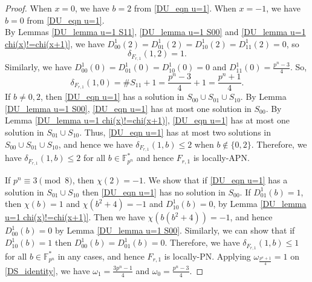 \documentclass[11pt]{article}
\numberwithin{theorem}{section}
\newcommand{\Fpnmul}{\mathbb{F}_{p^n}^*}
\begin{document}
\begin{proof}
	When $x=0$, we have $b=2$ from \eqref{DU_eqn u=1}. When $x=-1$, we have $b=0$ from \eqref{DU_eqn u=1}.\\
	By Lemmas \ref{DU_lemma u=1 S11}, \ref{DU_lemma u=1 S00} and \ref{DU_lemma u=1 chi(x)!=chi(x+1)}, we have $D_{00}^1(2)=D_{01}^1(2)=D_{10}^1(2)=D_{11}^1(2)=0$, so $$\delta_{F_{r,1}}(1,2)=1.$$
	Similarly, we have $D_{00}^1(0)=D_{01}^1(0)=D_{10}^1(0)=0$ and $D_{11}^1(0)=\frac{p^n-3}{4}$. So, 
	$$\delta_{F_{r,1}}(1,0) = \#S_{11} +1 =\frac{p^n-3}{4}+1=\frac{p^n+1}{4}.$$
	If $b\ne 0,2$, then \eqref{DU_eqn u=1} has a solution in $S_{00}\cup S_{01} \cup S_{10}$. By Lemma \ref{DU_lemma u=1 S00}, \eqref{DU_eqn u=1} has at most one solution in $S_{00}$.  By Lemma \ref{DU_lemma u=1 chi(x)!=chi(x+1)}, \eqref{DU_eqn u=1} has at most one solution in $S_{01} \cup S_{10}$. Thus, \eqref{DU_eqn u=1} has at most two solutions in $S_{00}\cup S_{01} \cup S_{10}$, and hence we have $\delta_{F_{r,1}}(1,b)\le 2$ when $b\not\in \{0,2\}$. Therefore, we have $\delta_{F_{r,1}}(1,b)\le 2$ for all $b\in \Fpnmul$ and hence $F_{r,1}$ is locally-APN.
	
	If $p^n\equiv 3\pmod{8}$, then $\chi(2)=-1$. We show that if \eqref{DU_eqn u=1} has a solution in $S_{01} \cup S_{10}$ then \eqref{DU_eqn u=1} has no solution in $S_{00}$. If $D_{01}^1(b)=1$, then $\chi(b)=1$ and $\chi(b^2+4)=-1$ and $D_{10}^1(b)=0$, by Lemma \ref{DU_lemma u=1 chi(x)!=chi(x+1)}. Then we have $\chi\left( b(b^2+4) \right) =-1$, and hence $D_{00}^1(b)=0$ by Lemma \ref{DU_lemma u=1 S00}. Similarly, we can show that if $D_{10}^1(b)=1$ then $D_{00}^1(b)=D_{01}^1(b)=0$. Therefore, we have $\delta_{F_{r,1}}(1,b)\le 1$ for all $b\in \Fpnmul$ in any cases, and hence $F_{r,1}$ is locally-PN. Applying $\omega_{\frac{p^n+1}{4}}=1$ on \eqref{DS_identity}, we have $\omega_1=\frac{3p^n-1}{4}$ and $\omega_0 = \frac{p^n-3}{4}$.
	

\end{proof}
\end{document}
